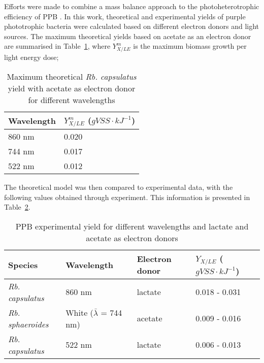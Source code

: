 Efforts were made to combine a mass balance approach to the photoheterotrophic efficiency of PPB \cite{Minkevich2004}. In this work, theoretical and experimental yields of purple phototrophic bacteria were calculated based on different electron donors and light sources. The maximum theoretical yields based on acetate as an electron donor are summarised in Table~\ref{tab:theoreticalQuantum}, where $Y^m_{X/LE}$ is the maximum biomass growth per light energy dose;

\begin{table}[H]
  \begin{center}
    \caption{Maximum theoretical \textit{Rb. capsulatus} yield with
      acetate as electron donor for different wavelengths
      \cite{Minkevich2004}}
    \label{tab:theoreticalQuantum}
    \begin{tabular}{ | l | l |}
      \hline
      Wavelength& $Y^m_{X/LE}$ ($gVSS\cdot kJ^{-1}$)\\ \hline \hline
      860 nm & 0.020 \\ \hline
      744 nm & 0.017  \\ \hline
      522 nm & 0.012  \\ \hline
    \end{tabular}
  \end{center}
\end{table}

The theoretical model was then compared to experimental data, with the
following values obtained through experiment. This information is
presented in Table~\ref{tab:expQuantum}.

\begin{table}[H]
  \begin{center}
    \caption{PPB experimental yield for different wavelengths and
      lactate and acetate as electron donors\cite{Minkevich2004}}
    \label{tab:expQuantum}
    \begin{tabular}{ | l | l | l | l |}
      \hline
      \textbf{Species} & \textbf{Wavelength} & \textbf{Electron donor} & $Y_{X/LE}$ ($gVSS\cdot kJ^{-1}$)\\ \hline \hline
      \textit{Rb. capsulatus} & 860 nm & lactate & 0.018 - 0.031 \\ \hline
      \textit{Rb. sphaeroides} & White ($\bar{\lambda}$ = 744 nm) & acetate & 0.009 - 0.016 \\ \hline
      \textit{Rb. capsulatus} & 522 nm & lactate & 0.006 - 0.013 \\ \hline

    \end{tabular}
  \end{center}
\end{table}
	
